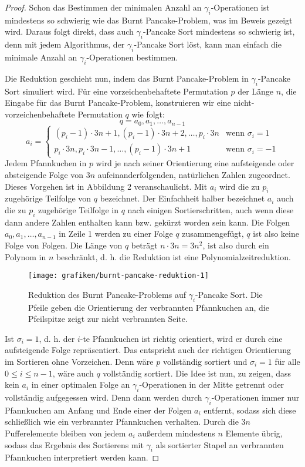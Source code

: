 \documentclass[a4paper, 11pt, ngerman]{article}
\begin{document}
\begin{proof}
    Schon das Bestimmen der minimalen Anzahl an $\gamma_i$-Operationen ist mindestens so schwierig wie das Burnt Pancake-Problem, was im Beweis gezeigt wird. Daraus folgt direkt, dass auch $\gamma_i$-Pancake Sort mindestens so schwierig ist, denn mit jedem Algorithmus, der $\gamma_i$-Pancake Sort löst, kann man einfach die minimale Anzahl an $\gamma_i$-Operationen bestimmen.

    Die Reduktion geschieht nun, indem das Burnt Pancake-Problem in $\gamma_i$-Pancake Sort simuliert wird. Für eine vorzeichenbehaftete Permutation $p$ der Länge $n$, die Eingabe für das Burnt Pancake-Problem, konstruieren wir eine nicht-vorzeichenbehaftete Permutation $q$ wie folgt:
    $$
        q = a_0, a_1, \dots, a_{n-1}
    $$
    $$
        a_i  = \begin{cases}
            (p_i - 1) \cdot 3n + 1, (p_i - 1) \cdot 3n + 2, \dots, p_i \cdot 3n & \text{wenn } \sigma_i = 1  \\
            p_i \cdot 3n, p_i \cdot 3n - 1, \dots, (p_i - 1) \cdot 3n + 1       & \text{wenn } \sigma_i = -1
        \end{cases}
    $$
    Jedem Pfannkuchen in $p$ wird je nach seiner Orientierung eine aufsteigende oder absteigende Folge von $3n$ aufeinanderfolgenden, natürlichen Zahlen zugeordnet. Dieses Vorgehen ist in Abbildung 2 veranschaulicht. Mit $a_i$ wird die zu $p_i$ zugehörige Teilfolge von $q$ bezeichnet. Der Einfachheit halber bezeichnet $a_i$ auch die zu $p_i$ zugehörige Teilfolge in $q$ nach einigen Sortierschritten, auch wenn diese dann andere Zahlen enthalten kann bzw. gekürzt worden sein kann. Die Folgen $a_0, a_1, \dots, a_{n-1}$ in Zeile 1 werden zu einer Folge $q$ zusammengefügt, $q$ ist also keine Folge von Folgen. Die Länge von $q$ beträgt $n \cdot 3n = 3n^2$, ist also durch ein Polynom in $n$ beschränkt, d. h. die Reduktion ist eine Polynomialzeitreduktion.

    \begin{figure}[h]
        \centering
        \texttt{[image: grafiken/burnt-pancake-reduktion-1]}
        \caption{Reduktion des Burnt Pancake-Problems auf $\gamma_i$-Pancake Sort. Die Pfeile geben die Orientierung der verbrannten Pfannkuchen an, die Pfeilspitze zeigt zur nicht verbrannten Seite.}
    \end{figure}
    Ist $\sigma_i = 1$, d. h. der $i$-te Pfannkuchen ist richtig orientiert, wird er durch eine aufsteigende Folge repräsentiert. Das entspricht auch der richtigen Orientierung im Sortieren ohne Vorzeichen. Denn wäre $p$ vollständig sortiert und $\sigma_i = 1$ für alle $0 \le i \le n - 1$, wäre auch $q$ vollständig sortiert. Die Idee ist nun, zu zeigen, dass kein $a_i$ in einer optimalen Folge an $\gamma_i$-Operationen in der Mitte getrennt oder vollständig aufgegessen wird. Denn dann werden durch $\gamma_i$-Operationen immer nur Pfannkuchen am Anfang und Ende einer der Folgen $a_i$ entfernt, sodass sich diese schließlich wie ein verbrannter Pfannkuchen verhalten. Durch die $3n$ Pufferelemente bleiben von jedem $a_i$ außerdem mindestens $n$ Elemente übrig, sodass das Ergebnis des Sortierens mit $\gamma_i$ als sortierter Stapel an verbrannten Pfannkuchen interpretiert werden kann.


\end{proof}
\end{document}
